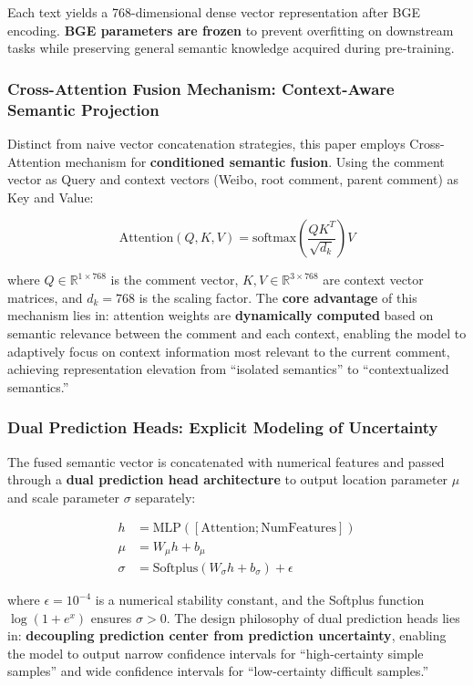 \documentclass[10pt]{article}
\begin{document}
Each text yields a 768-dimensional dense vector representation after BGE encoding. \textbf{BGE parameters are frozen} to prevent overfitting on downstream tasks while preserving general semantic knowledge acquired during pre-training.

\subsubsection{Cross-Attention Fusion Mechanism: Context-Aware Semantic Projection}

Distinct from naive vector concatenation strategies, this paper employs Cross-Attention mechanism for \textbf{conditioned semantic fusion}. Using the comment vector as Query and context vectors (Weibo, root comment, parent comment) as Key and Value:

\begin{equation}
\text{Attention}(Q, K, V) = \text{softmax}\left(\frac{QK^T}{\sqrt{d_k}}\right)V
\end{equation}

where $Q \in \mathbb{R}^{1 \times 768}$ is the comment vector, $K, V \in \mathbb{R}^{3 \times 768}$ are context vector matrices, and $d_k = 768$ is the scaling factor. The \textbf{core advantage} of this mechanism lies in: attention weights are \textbf{dynamically computed} based on semantic relevance between the comment and each context, enabling the model to adaptively focus on context information most relevant to the current comment, achieving representation elevation from ``isolated semantics'' to ``contextualized semantics.''

\subsubsection{Dual Prediction Heads: Explicit Modeling of Uncertainty}

The fused semantic vector is concatenated with numerical features and passed through a \textbf{dual prediction head architecture} to output location parameter $\mu$ and scale parameter $\sigma$ separately:

\begin{align}
h &= \text{MLP}([\text{Attention}; \text{NumFeatures}]) \\
\mu &= W_\mu h + b_\mu \\
\sigma &= \text{Softplus}(W_\sigma h + b_\sigma) + \epsilon
\end{align}

where $\epsilon = 10^{-4}$ is a numerical stability constant, and the Softplus function $\log(1+e^x)$ ensures $\sigma > 0$. The design philosophy of dual prediction heads lies in: \textbf{decoupling prediction center from prediction uncertainty}, enabling the model to output narrow confidence intervals for ``high-certainty simple samples'' and wide confidence intervals for ``low-certainty difficult samples.''
\end{document}
